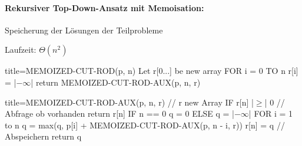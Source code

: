 \documentclass[
    ngerman,
    color=3b,
    dark_mode,
    load_common, %
    summary,
    boxarc,
]{tuda_summary}
\begin{document}
\paragraph{Rekursiver Top-Down-Ansatz mit Memoisation:}\mbox{}
\begin{idea}\mbox{}
    Speicherung der Lösungen der Teilprobleme
\end{idea}
Laufzeit: $\Theta(n^2)$

\begin{codeBlock}[autogobble,escapeinside=||]{title={MEMOIZED-CUT-ROD(p, n)}}
    Let r[0...] be new array
    FOR i = 0 TO n
        r[i] = |$-\infty$|
    return MEMOIZED-CUT-ROD-AUX(p, n, r)
\end{codeBlock}
\begin{codeBlock}[autogobble,escapeinside=||]{title={MEMOIZED-CUT-ROD-AUX(p, n, r)       // r new Array}}
    IF r[n] |$\geq$| 0                        // Abfrage ob vorhanden
        return r[n]
    IF n == 0
        q = 0
    ELSE
        q = |$-\infty$|
        FOR i = 1 to n
        q = max(q, p[i] + MEMOIZED-CUT-ROD-AUX(p, n - i, r))
    r[n] = q                            // Abspeichern
    return q
\end{codeBlock}
\pagebreak
\end{document}
